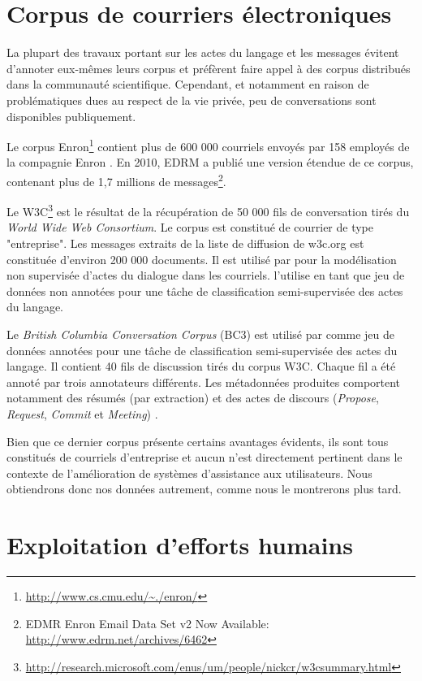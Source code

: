 \section{Corpus de courriers électroniques}

La plupart des travaux portant sur les actes du langage et les messages évitent d'annoter eux-mêmes leurs corpus et préfèrent faire appel à des corpus distribués dans la communauté scientifique. Cependant, et notamment en raison de problématiques dues au respect de la vie privée, peu de conversations sont disponibles publiquement.

Le corpus Enron\footnote{\url{http://www.cs.cmu.edu/~./enron/}} contient plus de 600 000 courriels envoyés par 158 employés de la compagnie Enron \cite{klimt2004introducing}. En 2010, EDRM a publié une version étendue de ce corpus, contenant plus de 1,7 millions de messages\footnote{EDMR Enron Email Data Set v2 Now Available: \url{http://www.edrm.net/archives/6462}}.

Le W3C\footnote{\url{http://research.microsoft.com/enus/um/people/nickcr/w3csummary.html}} est le résultat de la récupération de 50 000 fils de conversation tirés du \textit{World Wide Web Consortium}. Le corpus est constitué de courrier de type "entreprise". Les messages extraits de la liste de diffusion de w3c.org est constituée d'environ 200 000 documents. Il est utilisé par \cite{joty:2011:ijcai} pour la modélisation non supervisée d'actes du dialogue dans les courriels. \cite{joty:2013:sigdial} l'utilise en tant que jeu de données non annotées pour une tâche de classification semi-supervisée des actes du langage.

Le \textit{British Columbia Conversation Corpus} (BC3) est utilisé par \cite{joty:2013:sigdial} comme jeu de données annotées pour une tâche de classification semi-supervisée des actes du langage. Il contient 40 fils de discussion tirés du corpus W3C. Chaque fil a été annoté par trois annotateurs différents. Les métadonnées produites comportent notamment des résumés (par extraction) et des actes de discours (\textit{Propose}, \textit{Request}, \textit{Commit} et \textit{Meeting}) \cite{JanAAAI08}.

Bien que ce dernier corpus présente certains avantages évidents, ils sont tous constitués de courriels d'entreprise et aucun n'est directement pertinent dans le contexte de l'amélioration de systèmes d'assistance aux utilisateurs. Nous obtiendrons donc nos données autrement, comme nous le montrerons plus tard.

\section{Exploitation d'efforts humains}

